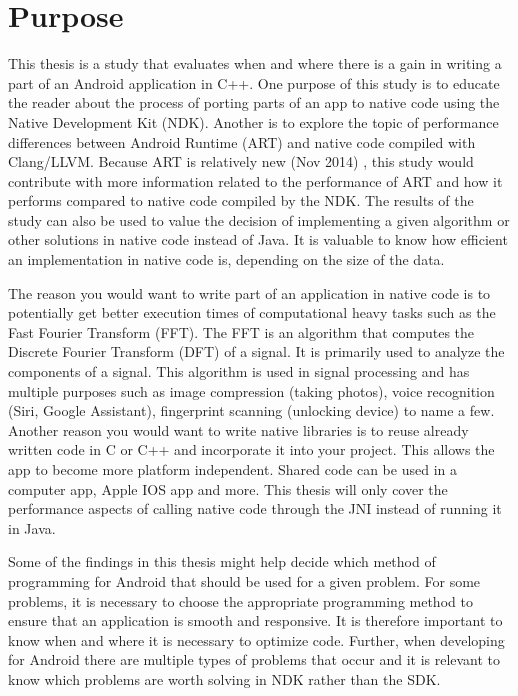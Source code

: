 \section{Purpose}
This thesis is a study that evaluates when and where there is a gain in writing a part of an Android application in C++. One purpose of this study is to educate the reader about the process of porting parts of an app to native code using the Native Development Kit (NDK). Another is to explore the topic of performance differences between Android Runtime (ART) and native code compiled with Clang/LLVM. Because ART is relatively new (Nov 2014) \cite{android:dalvik:release}, this study would contribute with more information related to the performance of ART and how it performs compared to native code compiled by the NDK. The results of the study can also be used to value the decision of implementing a given algorithm or other solutions in native code instead of Java. It is valuable to know how efficient an implementation in native code is, depending on the size of the data.


The reason you would want to write part of an application in native code is to potentially get better execution times of computational heavy tasks such as the Fast Fourier Transform (FFT). The FFT is an algorithm that computes the Discrete Fourier Transform (DFT) of a signal. It is primarily used to analyze the components of a signal. This algorithm is used in signal processing and has multiple purposes such as image compression (taking photos), voice recognition (Siri, Google Assistant), fingerprint scanning (unlocking device) to name a few. Another reason you would want to write native libraries is to reuse already written code in C or C++ and incorporate it into your project. This allows the app to become more platform independent. Shared code can be used in a computer app, Apple IOS app and more. This thesis will only cover the performance aspects of calling native code through the JNI instead of running it in Java.

Some of the findings in this thesis might help decide which method of programming for Android that should be used for a given problem. For some problems, it is necessary to choose the appropriate programming method to ensure that an application is smooth and responsive. It is therefore important to know when and where it is necessary to optimize code. Further, when developing for Android there are multiple types of problems that occur and it is relevant to know which problems are worth solving in NDK rather than the SDK.

